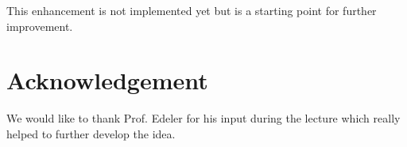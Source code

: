 \documentclass[notitlepage, a4paper, 11pt]{scrartcl}
\begin{document}
\begin{multicols}{2}
This enhancement is not implemented yet but is a starting point for further improvement.

\section{Acknowledgement}

We would like to thank Prof. Edeler for his input during the lecture which really helped to further develop the idea.

\end{multicols}

 

\end{document}
